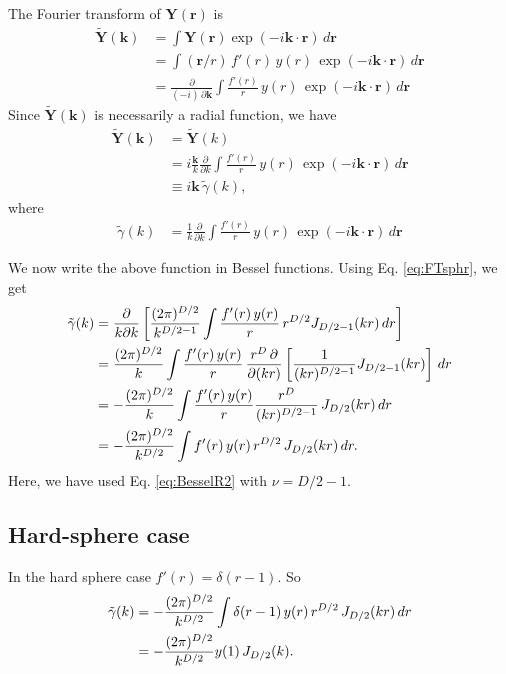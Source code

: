 \documentclass[preprint]{revtex4-1}
\numberwithin{equation}{subsection}
\numberwithin{table}{section}
\newcommand{\vct}[1]{\mathbf{#1}}
\providecommand{\vr}{} %
\renewcommand{\vr}{\vct{r}}
\newcommand{\vk}{\vct{k}}
\begin{document}
The Fourier transform of $\vct Y(\vr)$ is
\begin{align*}
  \tilde{\vct{Y}}(\vk)
&=
\int \vct{Y}(\vr) \exp(-i\vk\cdot\vr) \, d\vr
\\
&=
\int (\vr/r) \, f'(r) \, y(r) \, \exp(-i\vk\cdot\vr) \, d\vr
\\
&=
\frac{\partial}{(-i) \, \partial \vk}
\int \frac{f'(r)}{r} \, y(r) \, \exp(-i\vk\cdot\vr) \, d\vr
\end{align*}
%
Since $\tilde{\vct{Y}}(\vk)$ is necessarily a radial function,
we have
\begin{align*}
  \tilde{\vct{Y}}(\vk)
&=
  \tilde{\vct{Y}}(k)
\\
&=
i \frac{\vk}{k} \frac{\partial}{\partial k}
\int \frac{f'(r)}{r} \, y(r) \, \exp(-i\vk\cdot\vr) \, d\vr
\\
&\equiv
i \vk \, \tilde{\gamma}(k),
\end{align*}
where
\begin{align*}
  \tilde{\gamma} (k)
&=
\frac{1}{k}
\frac{\partial}{\partial k}
\int \frac{f'(r)}{r} \, y(r) \, \exp(-i\vk\cdot\vr) \, d\vr
\end{align*}

We now write the above function in Bessel functions.
Using Eq. \eqref{eq:FTsphr}, we get
\begin{align}
  \tilde{\gamma}(k)
&=
\frac{\partial}{k\partial k}
\left[
\frac{(2\pi)^{D/2}}{k^{D/2-1}}
\int \frac{f'(r) \, y(r)}{r} \, r^{D/2} J_{D/2-1}(kr) \, dr
\right]
\notag \\
&=
\frac{(2\pi)^{D/2}}{k}
\int
\frac{f'(r) \, y(r)}{r}
\,
\frac{r^D \, \partial}{\partial (kr)}
\left[
\frac{1}{(kr)^{D/2-1}}
  J_{D/2-1}(kr)
\right]
\, dr
\notag \\
&=
-
\frac{(2\pi)^{D/2}}{k}
\int
\frac{f'(r) \, y(r)}{r}
\frac{r^D}
{
(kr)^{D/2-1}
}
\, J_{D/2}(kr) \, dr
\notag \\
&=
-\frac{(2\pi)^{D/2}}{k^{D/2}}
\int f'(r) \, y(r) \, r^{D/2} \, J_{D/2}(kr) \, dr.
\label{eq:wbessel1}
\end{align}
Here, we have used Eq. \eqref{eq:BesselR2}
with $\nu = D/2-1$.





\subsection{Hard-sphere case}

In the hard sphere case $f'(r) = \delta(r - 1)$.
So
\begin{align}
\tilde{\gamma}(k)
&=-\frac{(2\pi)^{D/2}}{k^{D/2}}
\int \delta(r - 1) \, y(r) \, r^{D/2} \, J_{D/2}(kr) \, dr
\notag \\
&=-\frac{(2\pi)^{D/2}}{k^{D/2}}
y(1) \, J_{D/2}(k).
\label{eq:gammahs}
\end{align}
\end{document}
